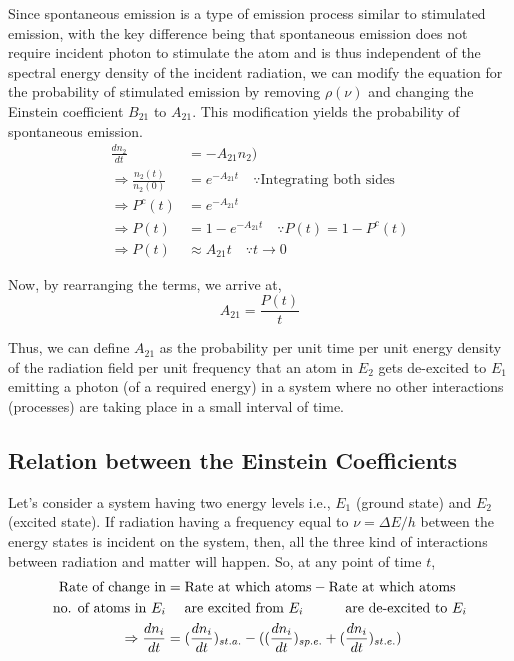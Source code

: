 \documentclass[12pt]{article}
\begin{document}
Since spontaneous emission is a type of emission process similar to stimulated emission, with the key difference being that spontaneous emission does not require incident photon to stimulate the atom and is thus independent of the spectral energy density of the incident radiation, we can modify the equation for the probability of stimulated emission by removing $\rho(\nu)$ and changing the Einstein coefficient $B_{21}$ to $A_{21}$. This modification yields the probability of spontaneous emission.
\begin{align*}
    \frac{dn_{2}}{dt} &= -A_{21}n_{2}) \\
    \Rightarrow \frac{n_2(t)}{n_2(0)} &= e^{-A_{21}t} \quad \because \text{Integrating both sides} \\
    \Rightarrow P^c(t) &= e^{-A_{21}t} \\
    \Rightarrow P(t) &= 1 - e^{-A_{21}t} \quad \because P(t) = 1 - P^c(t) \\
    \Rightarrow P(t) & \approx A_{21}t \quad \because t \to 0
\end{align*}

Now, by rearranging the terms, we arrive at,
\begin{equation}
    A_{21} = \frac{P(t)}{t}
\end{equation}

Thus, we can define $A_{21}$ as the probability per unit time per unit energy density of the radiation field per unit frequency that an atom in $E_{2}$ gets de-excited to $E_{1}$ emitting a photon (of a required energy) in a system where no other interactions (processes) are taking place in a small interval of time.

\subsection{Relation between the Einstein Coefficients}

Let's consider a system having two energy levels i.e., $E_{1}$ (ground state) and $E_{2}$ (excited state). If radiation having a frequency equal to $\nu = \Delta E/h$ between the energy states is incident on the system, then, all the three kind of interactions between radiation and matter will happen. So, at any point of time $t$,
\begin{align}
    \text{Rate of change in} & = \text{Rate at which atoms} - \text{Rate at which atoms} \notag \\
    \text{no. of atoms in } E_{i} & \quad \text{ are excited from } E_{i} \quad \qquad \text{are de-excited to } E_{i} \notag \\
    \Rightarrow \frac{dn_{i}}{dt} & = (\frac{dn_{i}}{dt})_{st.a.} - ((\frac{dn_{i}}{dt})_{sp.e.} + (\frac{dn_{i}}{dt})_{st.e.}) \notag
\end{align}
\end{document}
